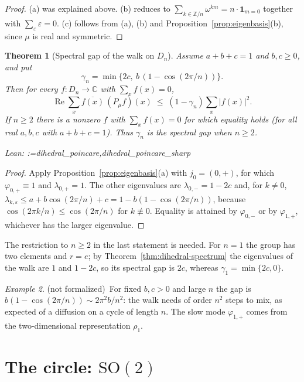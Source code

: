 \documentclass[11pt]{amsart}
\makeatletter
\newtheorem{theorem}{Theorem}[section]
\theoremstyle{definition}
\theoremstyle{remark}
\newtheorem{example}[theorem]{Example}
\newcommand{\@leanlist}[1]{\def\@leansep{}\@for\@leanname:=#1\do{\@leansep
  \texttt{\expandafter\detokenize\expandafter{\@leanname}}\def\@leansep{, }}}
\newcommand{\lean}[1]{\par\smallskip\noindent
  {\footnotesize\normalfont\raggedright\textsf{Lean:} \@leanlist{#1}\par}}
\newcommand{\notformal}{\textup{(not formalized)}}
\newcommand{\C}{\mathbb{C}}
\newcommand{\Z}{\mathbb{Z}}
\newcommand{\SO}{\mathrm{SO}}
\newcommand{\re}{\operatorname{Re}}
\newcommand{\one}{\mathbf{1}}
\makeatother
\begin{document}
\begin{proof}
(a) was explained above.  (b) reduces to $\sum_{k\in\Z/n}\omega^{km}=n\cdot\one_{m=0}$ together
with $\sum_\varepsilon\varepsilon=0$.  (c) follows from (a), (b) and
Proposition~\ref{prop:eigenbasis}(b), since $\mu$ is real and symmetric.
\end{proof}

\begin{theorem}[Spectral gap of the walk on $D_n$]\label{thm:dihedral-gap}
Assume $a+b+c=1$ and $b,c\ge0$, and put
\[
  \gamma_n=\min\bigl\{2c,\ b\,(1-\cos(2\pi/n))\bigr\}.
\]
Then for every $f\colon D_n\to\C$ with $\sum_xf(x)=0$,
\[
  \re\sum_x\overline{f(x)}\,(P_\mu f)(x)\;\le\;(1-\gamma_n)\sum_x|f(x)|^2 .
\]
If $n\ge2$ there is a nonzero $f$ with $\sum_xf(x)=0$ for which equality holds (for all real
$a,b,c$ with $a+b+c=1$).  Thus $\gamma_n$ is the spectral gap when $n\ge2$.
\lean{dihedral_poincare,dihedral_poincare_sharp}
\end{theorem}

\begin{proof}
Apply Proposition~\ref{prop:eigenbasis}(a) with $j_0=(0,+)$, for which
$\varphi_{0,+}\equiv1$ and $\lambda_{0,+}=1$.  The other eigenvalues are $\lambda_{0,-}=1-2c$
and, for $k\ne0$, $\lambda_{k,\varepsilon}\le a+b\cos(2\pi/n)+c=1-b(1-\cos(2\pi/n))$, because
$\cos(2\pi k/n)\le\cos(2\pi/n)$ for $k\not\equiv0$.  Equality is attained by $\varphi_{0,-}$ or
by $\varphi_{1,+}$, whichever has the larger eigenvalue.
\end{proof}

The restriction to $n\ge2$ in the last statement is needed.  For $n=1$ the group has two
elements and $r=e$; by Theorem~\ref{thm:dihedral-spectrum} the eigenvalues of the walk are $1$
and $1-2c$, so its spectral gap is $2c$, whereas $\gamma_1=\min\{2c,0\}$.

\begin{example}
\notformal\ For fixed $b,c>0$ and large $n$ the gap is $b(1-\cos(2\pi/n))\sim2\pi^2b/n^2$: the
walk needs of order $n^2$ steps to mix, as expected of a diffusion on a cycle of length $n$.
The slow mode $\varphi_{1,+}$ comes from the two-dimensional representation $\rho_1$.
\end{example}

\section{The circle: \texorpdfstring{$\SO(2)$}{SO(2)}}\label{sec:sotwo}
\end{document}
